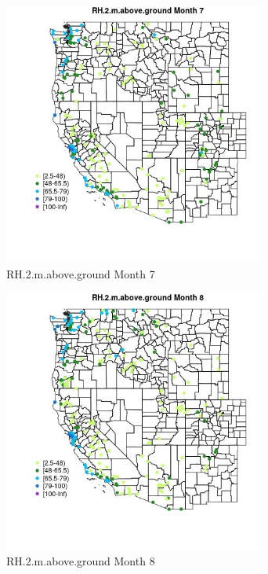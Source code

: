 \begin{figure} 
\centering  
\includegraphics[width=0.77\textwidth]{Code_Outputs/Report_ML_input_PM25_Step4_part_e_de_duplicated_aveswNAs_MapObsMo7RH2maboveground.jpg} 
\caption{\label{fig:Report_ML_input_PM25_Step4_part_e_de_duplicated_aveswNAsMapObsMo7RH2maboveground}RH.2.m.above.ground Month 7} 
\end{figure} 
 

\begin{figure} 
\centering  
\includegraphics[width=0.77\textwidth]{Code_Outputs/Report_ML_input_PM25_Step4_part_e_de_duplicated_aveswNAs_MapObsMo8RH2maboveground.jpg} 
\caption{\label{fig:Report_ML_input_PM25_Step4_part_e_de_duplicated_aveswNAsMapObsMo8RH2maboveground}RH.2.m.above.ground Month 8} 
\end{figure} 
 

